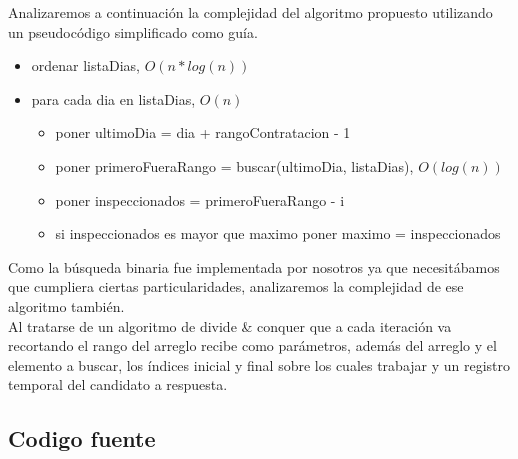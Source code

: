 Analizaremos a continuaci\'on la complejidad del algoritmo propuesto utilizando un pseudoc\'odigo simplificado como gu\'ia.

\begin{itemize}
\item ordenar listaDias, $O(n*log(n))$
\item para cada dia en listaDias, $O(n)$
\begin{itemize}
	\item poner ultimoDia = dia + rangoContratacion - 1
	\item poner primeroFueraRango = buscar(ultimoDia, listaDias), $O(log(n))$
	\item poner inspeccionados = primeroFueraRango - i
	\item si inspeccionados es mayor que maximo poner maximo = inspeccionados
\end{itemize}
\end{itemize}

Como la b\'usqueda binaria fue implementada por nosotros ya que necesit\'abamos que cumpliera ciertas particularidades, analizaremos la complejidad de ese algoritmo tambi\'en.\\
Al tratarse de un algoritmo de divide \& conquer que a cada iteraci\'on va recortando el rango del arreglo recibe como par\'ametros, adem\'as del arreglo y el elemento a buscar, los \'indices inicial y final sobre los cuales trabajar y un registro temporal del candidato a respuesta.

\subsection{Codigo fuente}

